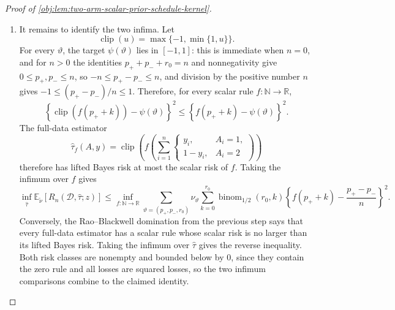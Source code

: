 \begin{proof}[Proof of \cref{obj:lem:two-arm-scalar-prior-schedule-kernel}]
\begin{enumerate}
\item It remains to identify the two infima.  Let
\[
\operatorname{clip}(u)=\max\{-1,\min\{1,u\}\}.
\]
For every \(\vartheta\), the target \(\psi(\vartheta)\) lies in \([-1,1]\): this is immediate when \(n=0\), and for \(n>0\) the identities \(p_++p_-+r_0=n\) and nonnegativity give \(0\le p_+,p_-\le n\), so \(-n\le p_+-p_-\le n\), and division by the positive number \(n\) gives \(-1\le (p_+-p_-)/n\le 1\).  Therefore, for every scalar rule \(f:\mathbb N\to\mathbb R\),
\[
\left\{\operatorname{clip}(f(p_+ + k))-\psi(\vartheta)\right\}^2
\le
\left\{f(p_+ + k)-\psi(\vartheta)\right\}^2.
\]
The full-data estimator
\[
\widehat\tau_f(A,y)
=
\operatorname{clip}\!\left(
f\!\left(\sum_{i=1}^n
\begin{cases}
y_i,&A_i=1,\\
1-y_i,&A_i=2
\end{cases}\right)\right)
\]
therefore has lifted Bayes risk at most the scalar risk of \(f\).  Taking the infimum over \(f\) gives
\[
\inf_{\widehat\tau}
\mathbb E_{\widetilde\nu}\!\left[
R_n(\mathcal D,\widehat\tau;z)
\right]
\le
\inf_{f:\mathbb N\to\mathbb R}
\sum_{\vartheta=(p_+,p_-,r_0)}
\nu_\vartheta
\sum_{k=0}^{r_0}
\operatorname{binom}_{1/2}(r_0,k)
\left\{
f(p_+ + k)-\frac{p_+-p_-}{n}
\right\}^2 .
\]
Conversely, the Rao--Blackwell domination from the previous step says that every full-data estimator has a scalar rule whose scalar risk is no larger than its lifted Bayes risk.  Taking the infimum over \(\widehat\tau\) gives the reverse inequality.  Both risk classes are nonempty and bounded below by \(0\), since they contain the zero rule and all losses are squared losses, so the two infimum comparisons combine to the claimed identity. %
\end{enumerate}
\end{proof}
